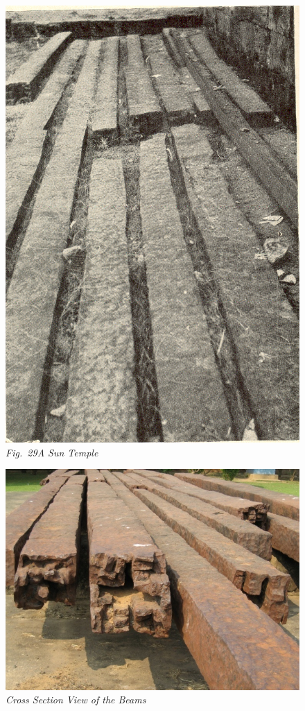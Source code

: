 \begin{figure}[H]
\renewcommand{\thefigure}{29 A}
\includegraphics[scale=1]{images/chapter-5/Fig29A.jpg}
\caption{\textit{Fig.~29A Sun Temple}}\label{chpater-005-fig29A}
\end{figure}

\begin{figure}[H]
\renewcommand{\thefigure}{29 B}
\includegraphics[scale=1.5]{images/chapter-5/Fig29B.jpg}
\caption{\textit{Cross Section View of the Beams}}\label{chpater-005-fig29B}
\end{figure}

